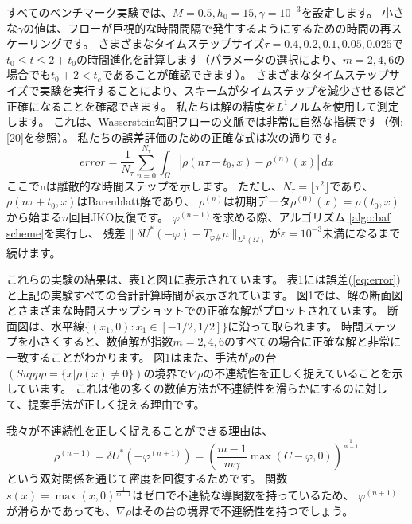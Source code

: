 \documentclass{jsarticle}
\theoremstyle{definition}
\begin{document}
{\color{red}
すべてのベンチマーク実験では、$M = 0.5, h_0 = 15, \gamma = 10^{-3}$を設定します。
}
小さな$\gamma$の値は、フローが巨視的な時間間隔で発生するようにするための時間の再スケーリングです。
さまざまなタイムステップサイズ$\tau = 0.4, 0.2, 0.1, 0.05, 0.025$で$t_0 \le t \le 2 + t_0$の時間進化を計算します（パラメータの選択により、$m = 2, 4, 6$の場合でも$t_0 + 2 < t_c$であることが確認できます）。
さまざまなタイムステップサイズで実験を実行することにより、スキームがタイムステップを減少させるほど正確になることを確認できます。
私たちは解の精度を$L^1$ノルムを使用して測定します。
これは、Wasserstein勾配フローの文脈では非常に自然な指標です（例:[20]を参照）。
私たちの誤差評価のための正確な式は次の通りです。
\begin{equation}
    \label{eq:error}
    error = \frac{1}{N_\tau} \sum_{n = 0}^{N_\tau} \int_\Omega |\rho(n \tau + t_0, x) - \rho^{(n)}(x)|\, dx
\end{equation}
ここでnは離散的な時間ステップを示します。
ただし、$N_\tau = \lfloor \tau^2 \rfloor$であり、$\rho(n\tau + t_0, x)$はBarenblatt解であり、
$\rho^{(n)}$は初期データ$\rho^{(0)}(x) = \rho(t_0, x)$から始まる$n$回目JKO反復です。
$\varphi^{(n+1)}$を求める際、アルゴリズム \ref{algo:baf scheme}を実行し、
残差$\|\delta U^*(- \varphi) - T_{\varphi \#} \mu \|_{L^1(\Omega)}$が$\varepsilon = 10^{-3}$未満になるまで続けます。

これらの実験の結果は、表1と図1に表示されています。
表1には誤差(\ref{eq:error})と上記の実験すべての合計計算時間が表示されています。
図1では、解の断面図とさまざまな時間スナップショットでの正確な解がプロットされています。
断面図は、水平線$\{(x_1, 0) : x_1 \in [-1/2, 1/2]\}$に沿って取られます。
時間ステップを小さくすると、数値解が指数$m = 2, 4, 6$のすべての場合に正確な解と非常に一致することがわかります。
図1はまた、手法が$\rho$の台$(Supp \rho = \{ x | \rho(x) \neq 0\})$の境界で$\nabla\rho$の不連続性を正しく捉えていることを示しています。
これは他の多くの数値方法が不連続性を滑らかにするのに対して、提案手法が正しく捉える理由です。

我々が不連続性を正しく捉えることができる理由は、
\[
    \rho^{(n+1)} = \delta U^*(- \varphi^{(n+1)}) = \left( \frac{m - 1}{m \gamma} \max(C - \varphi, 0)\right)^{\frac{1}{m-1}}
\]
という双対関係を通じて密度を回復するためです。
関数$s(x) = \max(x, 0)^{\frac{1}{m-1}}$はゼロで不連続な導関数を持っているため、
$\varphi^{(n+1)}$が滑らかであっても、$\nabla\rho$はその台の境界で不連続性を持つでしょう。
\end{document}
